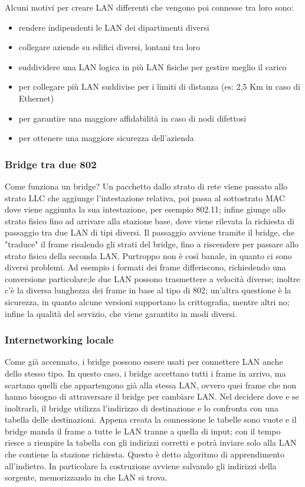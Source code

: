 Alcuni motivi per creare LAN differenti che vengono poi connesse tra loro sono:
\begin{itemize}
\item rendere indipendenti le LAN dei dipartimenti diversi
\item collegare aziende su edifici diversi, lontani tra loro
\item suddividere una LAN logica in più LAN fisiche per gestire meglio il carico
\item per collegare più LAN suddivise per i limiti di distanza (es: 2,5 Km in caso di Ethernet)
\item per garantire una maggiore affidabilità in caso di nodi difettosi
\item per ottenere una maggiore sicurezza dell'azienda
\end{itemize}

\subsubsection{Bridge tra due 802}
Come funziona un bridge?
Un pacchetto dallo strato di rete viene passato allo strato LLC che aggiunge l'intestazione relativa,
poi passa al sottostrato MAC dove viene aggiunta la sua intestazione, per esempio 802.11;
infine giunge allo strato fisico fino ad arrivare alla stazione base, dove viene rilevata la richiesta di passaggio tra due LAN di tipi diversi.
Il passaggio avviene tramite il bridge, che "traduce" il frame risalendo gli strati del bridge, fino a riscendere per passare allo strato fisico della seconda LAN.
Purtroppo non è così banale, in quanto ci sono diversi problemi.
Ad esempio i formati dei frame differiscono, richiedendo una conversione particolare;le due LAN possono trasmettere a velocità diverse;
inoltre c'è la diversa lunghezza dei frame in base al tipo di 802; un'altra questione è la sicurezza, in quanto alcune versioni supportano la crittografia, mentre altri no; infine la qualità del servizio, che viene garantito in modi diversi.

\subsubsection{Internetworking locale}
Come già accennato, i bridge possono essere usati per connettere LAN anche dello stesso tipo.
In questo caso, i bridge accettano tutti i frame in arrivo, ma scartano quelli che appartengono già alla stessa LAN,
ovvero quei frame che non hanno bisogno di attraversare il bridge per cambiare LAN.
Nel decidere dove e se inoltrarli, il bridge utilizza l'indirizzo di destinazione e lo confronta con una tabella delle destinazioni.
Appena creata la connessione le tabelle sono vuote e il bridge manda il frame a tutte le LAN tranne a quella di input;
con il tempo riesce a riempire la tabella con gli indirizzi corretti e potrà inviare solo alla LAN che contiene la stazione richiesta.
Questo è detto algoritmo di apprendimento all'indietro.
In particolare la costruzione avviene salvando gli indirizzi della sorgente, memorizzando in che LAN si trova.

